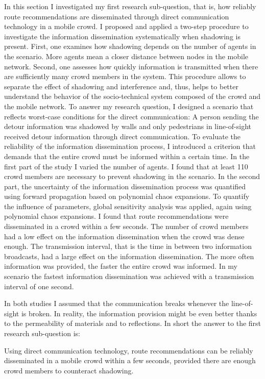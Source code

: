 In this section I investigated my first research sub-question, that is, how reliably route recommendations are disseminated through direct communication technology in a mobile crowd.
I proposed and applied a two-step procedure to investigate the information dissemination systematically when shadowing is present. First, one examines how shadowing depends on the number of agents in the scenario.  More agents mean a closer distance between nodes in the mobile network. Second, one assesses how quickly information is transmitted when there are sufficiently many crowd members in the system. This procedure allows to separate the effect of shadowing and interference and, thus,  helps to better understand the behavior of the socio-technical system composed of the crowd and the mobile network. To answer my research question, I designed a scenario that reflects worst-case conditions for the direct communication: A person sending the detour information was shadowed by walls and only pedestrians in line-of-sight received detour information through direct communication.
To evaluate the reliability of the information dissemination process, I introduced a criterion that demands that the entire crowd must be informed within a certain time. 
In the first part of the study I varied the number of agents. I found that at least 110 crowd members are necessary to prevent shadowing in the scenario. In the second part, the uncertainty of the information dissemination process was quantified using forward propagation based on polynomial chaos expansions. To quantify the influence of parameters, global sensitivity analysis was applied, again using polynomial chaos expansions. I found that route recommendations were disseminated in a crowd within a few seconds. The number of crowd members had a low effect on the information dissemination when the crowd was dense enough. The transmission interval, that is the time in between two information broadcasts, had a large effect on the information dissemination. The more often information was provided, the faster the entire crowd was informed. In my scenario the fastest information dissemination was achieved with a transmission interval of one second. 


In both studies I assumed that the communication breaks whenever the line-of-sight is broken. In reality, the information provision might be even better thanks to the permeability of materials and to reflections. In short the answer to the first research sub-question is:

\begin{tcolorbox}[title=How reliably are route recommendations disseminated using direct communication in a crowd? (RQ-1)]
Using direct communication technology, route recommendations can be reliably disseminated in a mobile crowd  within a few seconds, provided there are enough crowd members to counteract shadowing.
\end{tcolorbox}



